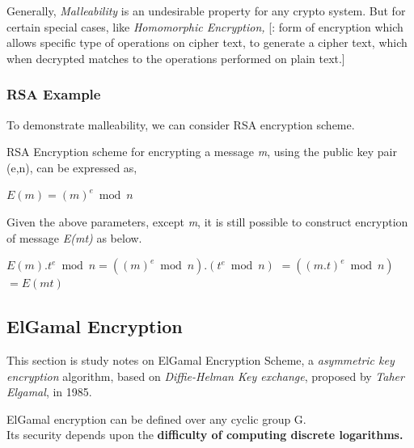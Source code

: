 \documentclass[12pt]{article}
\begin{document}
Generally, \textit{Malleability} is an undesirable property for any crypto system. But for certain special 
cases, like \textit{Homomorphic Encryption,} [: form of encryption which allows specific type of operations on
cipher text, to generate a cipher text, which when decrypted matches to the operations performed on plain 
text.]

\subsubsection{RSA Example}
To demonstrate malleability, we can consider RSA encryption scheme.

\bigskip

RSA Encryption scheme for encrypting a message \textit{m}, using the public key pair (e,n), can be expressed 
as,
\bigskip

\begin{center}
$E(m) = (m)^e \bmod n$
\end{center}

Given the above parameters, except \textit{m}, it is still possible to construct encryption of message \textit{E(mt)} as below.
\bigskip

\begin{center}
$ E(m).t^e \bmod n = ((m)^e \bmod n).(t^e \bmod n)$
$                       = ((m.t)^e \bmod n)$
$                       = E(mt)$
\end{center}





%
%

\pagebreak
\vspace*{\fill}
\begin{center}
\section{ElGamal Encryption}
This section is study notes on ElGamal Encryption Scheme, a \textit{asymmetric key encryption} algorithm,
based on \textit{Diffie-Helman Key exchange}, proposed by \textit{Taher Elgamal}, in 1985.
\end{center}
ElGamal encryption can be defined over any cyclic group G. \\
Its security depends upon the \textbf{difficulty of computing discrete logarithms.}
\vspace*{\fill}
\pagebreak
\end{document}
